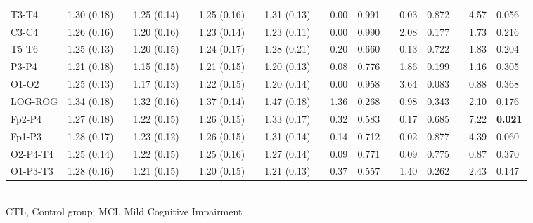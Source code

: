 \documentclass[10pt]{article}
\begin{document}
\begin{table}
\begin{small}
\begin{tabular}{lllllllllllllllll}
T3-T4    & 1.30 (0.18)&  & 1.25 (0.14)&  & 1.25 (0.16)&  & 1.31 (0.13)&  & 0.00 & 0.991 &  & 0.03 & 0.872 &  & 4.57 & 0.056 \\
C3-C4    & 1.26 (0.16)&  & 1.20 (0.16)&  & 1.23 (0.14)&  & 1.23 (0.11)&  & 0.00 & 0.990 &  & 2.08 & 0.177 &  & 1.73 & 0.216 \\
T5-T6    & 1.25 (0.13)&  & 1.20 (0.15)&  & 1.24 (0.17)&  & 1.28 (0.21)&  & 0.20 & 0.660 &  & 0.13 & 0.722 &  & 1.83 & 0.204 \\
P3-P4    & 1.21 (0.18)&  & 1.15 (0.15)&  & 1.21 (0.15)&  & 1.20 (0.13)&  & 0.08 & 0.776 &  & 1.86 & 0.199 &  & 1.16 & 0.305 \\
O1-O2    & 1.25 (0.13)&  & 1.17 (0.13)&  & 1.22 (0.15)&  & 1.20 (0.14)&  & 0.00 & 0.958 &  & 3.64 & 0.083 &  & 0.88 & 0.368 \\
LOG-ROG  & 1.34 (0.18)&  & 1.32 (0.16)&  & 1.37 (0.14)&  & 1.47 (0.18)&  & 1.36 & 0.268 &  & 0.98 & 0.343 &  & 2.10 & 0.176 \\
\midrule
Fp2-P4   & 1.27 (0.18)&  & 1.22 (0.15)&  & 1.26 (0.15)&  & 1.33 (0.17)&  & 0.32 & 0.583 &  & 0.17 & 0.685 &  & 7.22 &\bf 0.021 \\
Fp1-P3   & 1.28 (0.17)&  & 1.23 (0.12)&  & 1.26 (0.15)&  & 1.31 (0.14)&  & 0.14 & 0.712 &  & 0.02 & 0.877 &  & 4.39 & 0.060 \\
O2-P4-T4 & 1.25 (0.14)&  & 1.22 (0.15)&  & 1.25 (0.16)&  & 1.27 (0.14)&  & 0.09 & 0.771 &  & 0.09 & 0.775 &  & 0.87 & 0.370 \\
O1-P3-T3 & 1.28 (0.16)&  & 1.21 (0.15)&  & 1.20 (0.15)&  & 1.21 (0.13)&  & 0.37 & 0.557 &  & 1.40 & 0.262 &  & 2.43 & 0.147 \\
\bottomrule
\end{tabular}\\
CTL, Control group; MCI, Mild Cognitive Impairment
\end{small}
\end{table}
\end{document}
